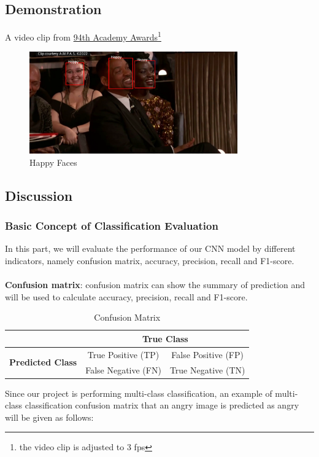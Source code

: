 \documentclass[11pt,a4paper]{article}
\begin{document}
    \newpage
    \subsection{Demonstration}
    A video clip from \href{https://www.youtube.com/watch?v=myjEoDypUD8&pbjreload=102}{94th Academy Awards}\footnote{the video clip is adjusted to 3 fps}
    \begin{figure}[H]
        \centering
        \includegraphics[width = 0.8\textwidth]{written_report/pictures/happy.png}
        \caption{Happy Faces}
        \label{fig:happy}
    \end{figure}
    
    \subsection{Discussion}
    \subsubsection{Basic Concept of Classification Evaluation}
    In this part, we will evaluate the performance of our CNN model by different indicators, namely confusion matrix, accuracy, precision, recall and F1-score. \\
    \\
    \textbf{Confusion matrix}: confusion matrix can show the summary of prediction and will be used to calculate accuracy, precision, recall and F1-score. 
    \begin{table}[H]
        \centering
        \begin{tabular}{c|c|c}
             & \multicolumn{2}{c}{\textbf{True Class}} \\
            \hline
            \multirow{2}{*}{\textbf{Predicted Class}} & True Positive (TP) & False Positive (FP) \\
            \cline{2-3}
             & False Negative (FN) & True Negative (TN)
        \end{tabular}
        \caption{Confusion Matrix}
        \label{tab:confusion_matrix}
    \end{table}
    \noindent
    Since our project is performing multi-class classification, an example of multi-class classification confusion matrix that an angry image is predicted as angry will be given as follows:
    
\end{document}
